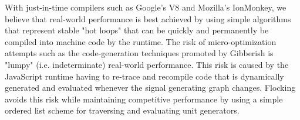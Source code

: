 \documentclass{article}
\begin{document}
With just-in-time compilers such as Google's V8 and Mozilla's IonMonkey, we believe that real-world performance is best achieved by using simple algorithms that represent stable "hot loops" that can be quickly and permanently be compiled into machine code by the runtime. The risk of micro-optimization attempts such as the code-generation techniques promoted by Gibberish is "lumpy" (i.e. indeterminate) real-world performance. This risk is caused by the JavaScript runtime having to re-trace and recompile code that is dynamically generated and evaluated whenever the signal generating graph changes. Flocking avoids this risk while maintaining competitive performance by using a simple ordered list scheme for traversing and evaluating unit generators.





\end{document}

